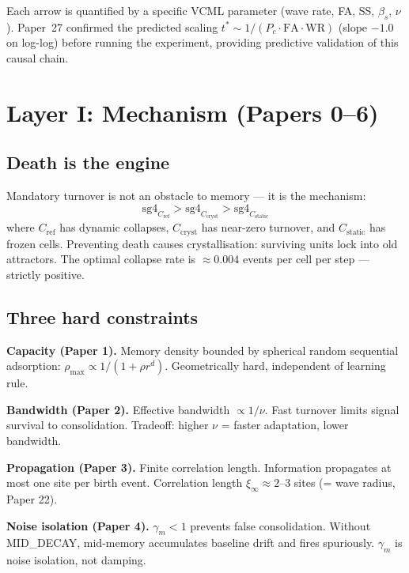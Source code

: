 \documentclass[11pt]{article}
\begin{document}
Each arrow is quantified by a specific VCML parameter
(wave rate, FA, SS, $\beta_s$, $\nu$).
Paper~27 confirmed the predicted scaling $t^* \sim 1/(P_c \cdot \mathrm{FA} \cdot \mathrm{WR})$
(slope $-1.0$ on log-log) before running the experiment, providing predictive validation
of this causal chain.

\section{Layer I: Mechanism (Papers 0--6)}

\subsection{Death is the engine}

Mandatory turnover is not an obstacle to memory --- it is the mechanism:
\begin{equation}
\mathrm{sg4}_{C_\mathrm{ref}} > \mathrm{sg4}_{C_\mathrm{cryst}} > \mathrm{sg4}_{C_\mathrm{static}}
\end{equation}
where $C_\mathrm{ref}$ has dynamic collapses, $C_\mathrm{cryst}$ has near-zero turnover,
and $C_\mathrm{static}$ has frozen cells.
Preventing death causes crystallisation: surviving units lock into old attractors.
The optimal collapse rate is $\approx 0.004$ events per cell per step --- strictly positive.

\subsection{Three hard constraints}

\textbf{Capacity (Paper 1).} Memory density bounded by spherical random sequential adsorption:
$\rho_\mathrm{max} \propto 1/(1 + \rho r^d)$.
Geometrically hard, independent of learning rule.

\textbf{Bandwidth (Paper 2).} Effective bandwidth $\propto 1/\nu$.
Fast turnover limits signal survival to consolidation.
Tradeoff: higher $\nu$ = faster adaptation, lower bandwidth.

\textbf{Propagation (Paper 3).} Finite correlation length.
Information propagates at most one site per birth event.
Correlation length $\xi_\infty \approx 2$--3 sites (= wave radius, Paper 22).

\textbf{Noise isolation (Paper 4).} $\gamma_m < 1$ prevents false consolidation.
Without MID\_DECAY, mid-memory accumulates baseline drift and fires spuriously.
$\gamma_m$ is noise isolation, not damping.
\end{document}
